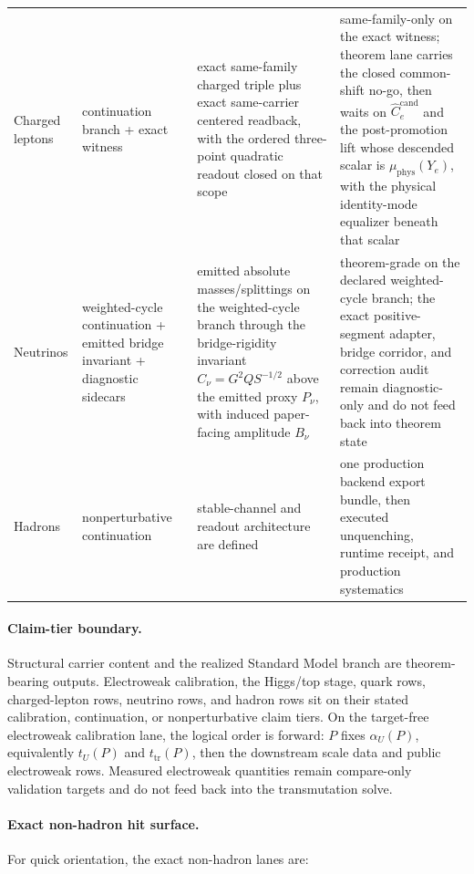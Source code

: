 \begin{longtable}{@{}>{\raggedright\arraybackslash}p{}>{\raggedright\arraybackslash}p{}>{\raggedright\arraybackslash}p{}>{\raggedright\arraybackslash}p{}@{}}
Charged leptons & continuation branch + exact witness & exact same-family charged triple plus exact same-carrier centered readback, with the ordered three-point quadratic readout closed on that scope & same-family-only on the exact witness; theorem lane carries the closed common-shift no-go, then waits on \(\widehat C_e^{\mathrm{cand}}\) and the post-promotion lift whose descended scalar is \(\mu_{\mathrm{phys}}(Y_e)\), with the physical identity-mode equalizer beneath that scalar \\
Neutrinos & weighted-cycle continuation + emitted bridge invariant + diagnostic sidecars & emitted absolute masses/splittings on the weighted-cycle branch through the bridge-rigidity invariant \(C_\nu=G^2Q S^{-1/2}\) above the emitted proxy \(P_\nu\), with induced paper-facing amplitude \(B_\nu\) & theorem-grade on the declared weighted-cycle branch; the exact positive-segment adapter, bridge corridor, and correction audit remain diagnostic-only and do not feed back into theorem state \\
Hadrons & nonperturbative continuation & stable-channel and readout architecture are defined & one production backend export bundle, then executed unquenching, runtime receipt, and production systematics \\
\end{longtable}
\normalsize

\paragraph{Claim-tier boundary.}
Structural carrier content and the realized Standard Model branch are theorem-bearing outputs.
Electroweak calibration, the Higgs/top stage, quark rows, charged-lepton rows, neutrino rows, and
hadron rows sit on their stated calibration, continuation, or nonperturbative claim tiers.
On the target-free electroweak calibration lane, the logical order is forward: \(P\) fixes \(\alpha_U(P)\),
equivalently \(t_U(P)\) and \(t_{\mathrm{tr}}(P)\), then the downstream scale data and public
electroweak rows. Measured electroweak quantities remain compare-only validation targets and do
not feed back into the transmutation solve.

\paragraph{Exact non-hadron hit surface.}
For quick orientation, the exact non-hadron lanes are:

